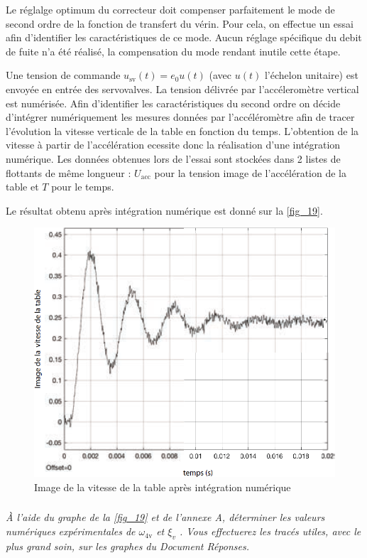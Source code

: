 \documentclass[10pt,fleqn]{article} %
\begin{document}
Le réglalge optimum du correcteur doit compenser parfaitement le mode de second ordre de la fonction de
transfert du vérin. Pour cela, on effectue un essai afin d’identifier les caractéristiques de ce mode. Aucun
réglage spécifique du debit de fuite n’a été réalisé, la compensation du mode rendant inutile cette étape.

Une tension de commande $u_{\text{sv}} (t) = e_0u(t)$ (avec $u(t)$ l’échelon unitaire) est envoyée en entrée des servovalves.
La tension délivrée par l’accéleromètre vertical est numérisée. Afin d’identifier les caractéristiques du second
ordre on décide d’intégrer numériquement les mesures données par l’accéléromètre afin de tracer l’évolution
la vitesse verticale de la table en fonction du temps. L’obtention de la vitesse à partir de l’accélération
ecessite donc la réalisation d’une intégration numérique. Les données obtenues lors de l’essai sont stockées
dans 2 listes de flottants de même longueur : $U_{\text{acc}}$ pour la tension image de l'accélération de la table et $T$ pour le temps.

Le résultat obtenu après intégration numérique est donné sur la \autoref{fig_19}.


\begin{figure}[H]
\centering
\includegraphics[width=0.55\linewidth]{fig_19}
\caption{Image de la vitesse de la table après intégration numérique \label{fig_19}}
\end{figure}



\subparagraph{\label{q_39}}\textit{À l’aide du graphe de la \autoref{fig_19} et de l’annexe A, déterminer les valeurs numériques
expérimentales de $\omega_{\text{4v}}$ et $\xi_v$ . Vous effectuerez les tracés utiles, avec le plus grand soin, sur
les graphes du Document Réponses.}
\ifprof
\begin{corrige} ~\\

\end{corrige}
\else
\fi
\end{document}
